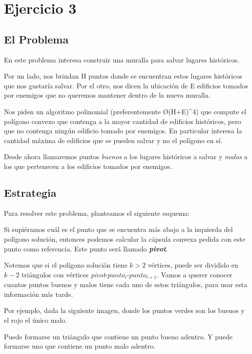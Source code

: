 \section{Ejercicio 3}
\subsection{El Problema}
En este problema interesa construir una muralla para salvar lugares históricos.

Por un lado, nos brindan H puntos donde se encuentran estos lugares históricos que nos gustaría salvar. Por el otro, nos dicen la ubicación de E edificios tomados por enemigos que no queremos mantener dentro de la nueva muralla.

Nos piden un algoritmo polinomial (preferentemente \O{(H+E)^4}) que compute el polígono convexo que contenga a la mayor cantidad de edificios históricos, pero que no contenga ningún edificio tomado por enemigos. En particular interesa la cantidad máxima de edificios que se pueden salvar y no el polígono en sí.

Desde ahora llamaremos puntos \textit{buenos} a los lugares históricos a salvar y \textit{malos} a los que pertenecen a los edificios tomados por enemigos.

\subsection{Estrategia}
Para resolver este problema, planteamos el siguiente esquema:

Si supiéramos cuál es el punto que se encuentra más abajo a la izquierda del polígono solución, entonces podemos calcular la cápsula convexa pedida con este punto como referencia. Este punto será llamado \textit{\textbf{pivot}}.

Notemos que si el polígono solución tiene $k > 2$ vértices, puede ser dividido en $k - 2$ triángulos con vértices \textit{pivot}-$punto_i$-$punto_{i+1}$. Vamos a querer conocer cuantos puntos buenos y malos tiene cada uno de estos triángulos, para usar esta información más tarde.

Por ejemplo, dada la siguiente imagen, donde los puntos verdes son los buenos y el rojo el único malo.


Puede formarse un triángulo que contiene un punto bueno adentro. Y puede formarse uno que contiene un punto malo adentro.


